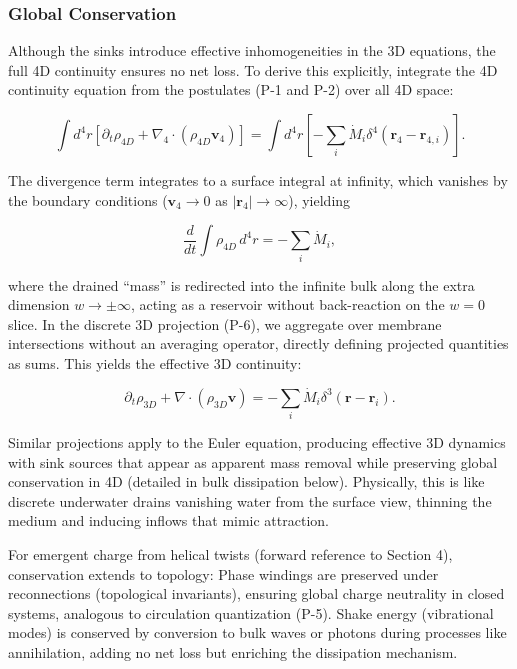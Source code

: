 \subsubsection{Global Conservation}
Although the sinks introduce effective inhomogeneities in the 3D equations, the full 4D continuity ensures no net loss. To derive this explicitly, integrate the 4D continuity equation from the postulates (P-1 and P-2) over all 4D space:

\begin{equation}
\int d^4 r \left[ \partial_t \rho_{4D} + \nabla_4 \cdot (\rho_{4D} \mathbf{v}_4) \right] = \int d^4 r \left[ -\sum_i \dot{M}_i \delta^4(\mathbf{r}_4 - \mathbf{r}_{4,i}) \right].
\end{equation}

The divergence term integrates to a surface integral at infinity, which vanishes by the boundary conditions ($\mathbf{v}_4 \to 0$ as $|\mathbf{r}_4| \to \infty$), yielding

\begin{equation}
\frac{d}{dt} \int \rho_{4D} \, d^4 r = -\sum_i \dot{M}_i,
\end{equation}

where the drained ``mass'' is redirected into the infinite bulk along the extra dimension $w \to \pm \infty$, acting as a reservoir without back-reaction on the $w=0$ slice. In the discrete 3D projection (P-6), we aggregate over membrane intersections without an averaging operator, directly defining projected quantities as sums. This yields the effective 3D continuity:

\begin{equation}
\partial_t \rho_{3D} + \nabla \cdot (\rho_{3D} \mathbf{v}) = -\sum_i \dot{M}_i \delta^3(\mathbf{r} - \mathbf{r}_i).
\end{equation}

Similar projections apply to the Euler equation, producing effective 3D dynamics with sink sources that appear as apparent mass removal while preserving global conservation in 4D (detailed in bulk dissipation below). Physically, this is like discrete underwater drains vanishing water from the surface view, thinning the medium and inducing inflows that mimic attraction.

For emergent charge from helical twists (forward reference to Section 4), conservation extends to topology: Phase windings are preserved under reconnections (topological invariants), ensuring global charge neutrality in closed systems, analogous to circulation quantization (P-5). Shake energy (vibrational modes) is conserved by conversion to bulk waves or photons during processes like annihilation, adding no net loss but enriching the dissipation mechanism.

